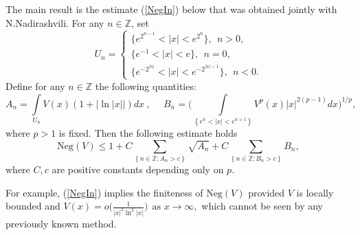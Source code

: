 \documentclass[10pt,a4paper]{article}
\begin{document}
The main result is the estimate (\ref{NegIn}) below that was obtained
jointly with N.Nadira\-shvili. For any $n\in \mathbb{Z}$, set 
\[
U_{n} =
\left\{
\begin{array}{l}
\{e^{2^{n-1}}<\left\vert x\right\vert <e^{2^{n}}\},\ \ n>0, \\
\{e^{-1}<\left\vert x\right\vert <e\}, \ \ n=0,
\\
\{e^{-2^{\left\vert n\right\vert }}<\left\vert x\right\vert
<e^{-2^{\left\vert n\right\vert -1}}\},\ \ n<0.
\end{array}
\right.
\]
Define for any $n\in \mathbb{Z}$ the following quantities:%
\begin{equation*}
A_{n}=\int\limits_{U_{n}}V\left( x\right) \left( 1+\left\vert \ln \left\vert
x\right\vert \right\vert \right) dx\ ,\ \ \text{ }\ B_{n}=\Big(
\int\limits_{\left\{ e^{n}<\left\vert x\right\vert <e^{n+1}\right\}
}V^{p}\left( x\right) \left\vert x\right\vert ^{2\left( p-1\right)
}dx\Big) ^{1/p},
\end{equation*}%
where $p>1$ is fixed. Then the following estimate holds%
\begin{equation}
\mathrm{Neg}\left( V\right) \leq 1+C\sum_{\left\{ n\in \mathbb{Z}%
:A_{n}>c\right\} }\sqrt{A_{n}}+C\sum_{\left\{ n\in \mathbb{Z}%
:B_{n}>c\right\} }B_{n},  \label{NegIn}
\end{equation}%
where $C,c$ are positive constants depending only on $p$.

For example, (\ref{NegIn}) implies the finiteness of $\mathrm{Neg}\left(
V\right) $ provided $V$ is locally bounded and 
$
V\left( x\right) =o\Big( \frac{1}{\left\vert x\right\vert ^{2}\ln
^{2}\left\vert x\right\vert }\Big) \ \ \text{as }x\rightarrow \infty ,
$
which cannot be seen by any previously known method. 
\end{document}
